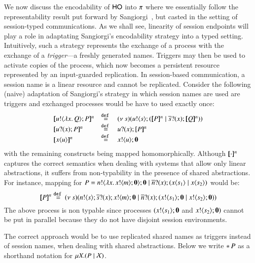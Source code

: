 We now discuss the encodability of  $\mathsf{HO}$ into $\pi$ where
we essentially follow the representability result put forward by 
Sangiorgi~\cite{San92,SaWabook}, but casted in the setting of session-typed communications. 
As we shall see, linearity of session endpoints will play a role in adaptating Sangiorgi's 
encodability strategy into a typed setting. 
Intuitively, such a strategy represents the exchange of a process with the exchange of 
a \emph{trigger}---a freshly generated names. 
Triggers may then be used to activate copies of the process, which now becomes a persistent 
resource represented by an input-guarded replication.
In session-based communication, a session name 
is a linear resource and cannot be replicated.
Consider the following (naive) adaptation of 
Sangiorgi's strategy in which session names are used are triggers and 
exchanged processes would be have to used exactly once:
%
\[
	\begin{array}{lcl}
		\pmap{\bout{u}{\abs{x}{Q}} P}{n} & \defeq &  \newsp{s}{\bout{u}{s} (\pmap{P}{n} \Par \binp{\dual{s}}{x} \pmap{Q}{n})} \\
		\pmap{\binp{u}{x} P}{n} & \defeq& \binp{u}{x} \pmap{P}{n}\\
		\pmap{\appl{x}{u}}{n} & \defeq & \bout{x}{u} \inact
	\end{array}
\]
%
with the remaining \HOp constructs being mapped homomorphically.
Although $[\!\![\cdot]\!\!]^{n}$ captures the correct semantics when
dealing with systems that allow only linear abstractions,
it suffers from non-typability in the presence
of shared abstractions. For instance,
mapping for $P = n ! \langle \lambda x.\,x ! \langle m \rangle ;\mathbf{0} \rangle ; \mathbf{0} \;|\; \overline{n} ? (x) ; (x\langle s_1 \rangle \;|\; x\langle s_2 \rangle)$
would be:
%
\[
	[\!\![P]\!\!]^{n} \stackrel{\mathtt{def}\ }{=}
	(\nu\ s)(n ! \langle s \rangle ; \overline{s} ? (x) ; x ! \langle m \rangle ; \mathbf{0} \;|\; \overline{n} ? (x) ; (x ! \langle s_1 \rangle ; \mathbf{0} \;|\; x ! \langle s_2 \rangle ; \mathbf{0}))
\]
%
The above process is non typable since processes $(x ! \langle s_1 \rangle ; \mathbf{0}$ and $x ! \langle s_2 \rangle ; \mathbf{0})$
cannot be put in parallel because they do not have disjoint session environments.

The correct approach would be to use replicated shared names
as triggers instead of session names, when dealing with shared abstractions. 
Below we write $\ast\,{} P$ as a shorthand notation for $\mu X. (P \;|\; \mathcal{X})$.

